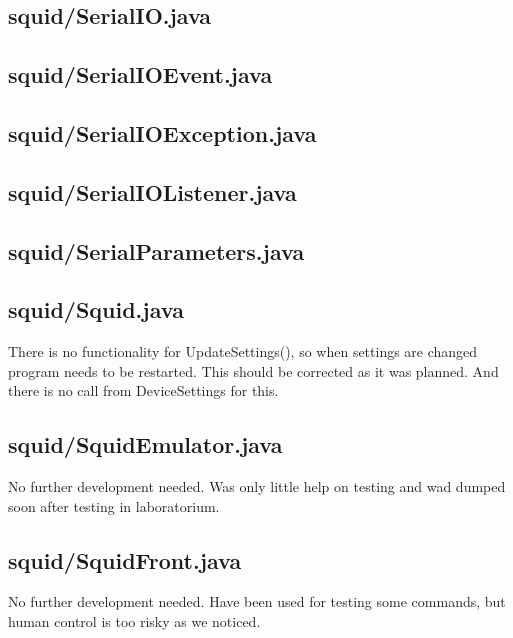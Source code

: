 \subsection{squid/SerialIO.java}

\subsection{squid/SerialIOEvent.java}

\subsection{squid/SerialIOException.java}

\subsection{squid/SerialIOListener.java}

\subsection{squid/SerialParameters.java}

\subsection{squid/Squid.java}

There is no functionality for UpdateSettings(), so when settings are changed program needs to be restarted. This should be corrected as it was planned. And there is no call from DeviceSettings for this.

\subsection{squid/SquidEmulator.java}

No further development needed. Was only little help on testing and wad dumped soon after testing in laboratorium.

\subsection{squid/SquidFront.java}

No further development needed. Have been used for testing some commands, but human control is too risky as we noticed.

